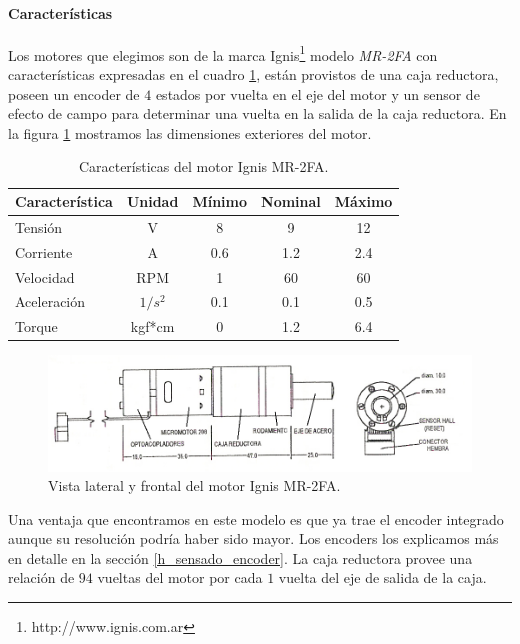 \paragraph{Caracter\'isticas}
\label{h_actuadores_motorDC_caracteristicas}

Los motores que elegimos son de la marca Ignis\footnote{http://www.ignis.com.ar} modelo \emph{MR-2FA}
con caracter\'isticas expresadas en el cuadro \ref{hT_motorDC}, est\'an provistos de una caja reductora,
poseen un encoder de $4$ estados por vuelta en el eje del motor y un sensor de efecto de campo para
determinar una vuelta en la salida de la caja reductora.
En la figura \ref{hF_motorDC} mostramos las dimensiones exteriores del motor.

\begin{table}
	\begin{center}
		\begin{tabular}{|l|c|c|c|c|}
			\hline
			Caracter\'istica & Unidad & M\'inimo & Nominal & M\'aximo \\
			\hline
			Tensi\'on & V & 8 & 9 & 12 \\
			Corriente & A & 0.6 & 1.2 & 2.4 \\
			Velocidad & RPM & 1 & 60 & 60 \\
			Aceleraci\'on & $1/s^{2}$ & 0.1 & 0.1 & 0.5 \\
			Torque & kgf*cm & 0 & 1.2 & 6.4 \\
			\hline
		\end{tabular}
	\end{center}
	\caption{Caracter\'isticas del motor Ignis MR-2FA.}
	\label{hT_motorDC}
\end{table}

\begin{figure}[ht]
	\centering
	\includegraphics[scale=1]{figuras/MR2-FA.png}
	\caption{Vista lateral y frontal del motor Ignis MR-2FA.}
	\label{hF_motorDC}
\end{figure}

Una ventaja que encontramos en este modelo es que ya trae el encoder integrado aunque su resoluci\'on podr\'ia haber sido mayor.
Los encoders los explicamos m\'as en detalle en la secci\'on \ref{h_sensado_encoder}.
La caja reductora provee una relaci\'on de $94$ vueltas del motor por cada $1$ vuelta del eje de salida de la caja.

